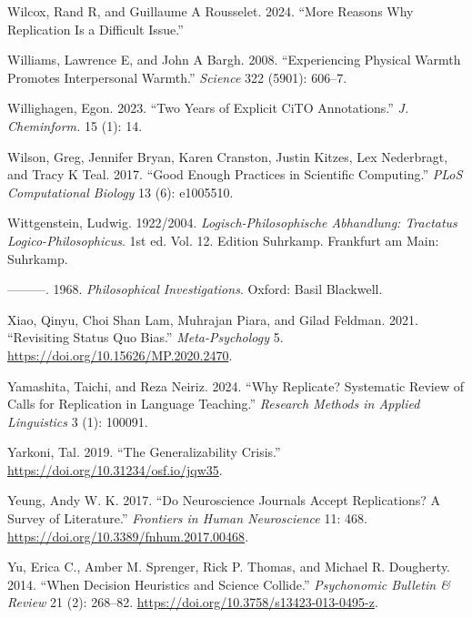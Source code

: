 \documentclass[
  letterpaper,
  DIV=11,
  numbers=noendperiod]{scrreprt}
\newlength{\cslhangindent}
\newenvironment{CSLReferences}[2] %
 {\begin{list}{}{%
  \setlength{\itemindent}{0pt}
  \setlength{\leftmargin}{0pt}
  \setlength{\parsep}{0pt}
  \ifodd #1
   \setlength{\leftmargin}{\cslhangindent}
   \setlength{\itemindent}{-1\cslhangindent}
  \fi
  \setlength{\itemsep}{#2\baselineskip}}}
 {\end{list}}
\begin{document}
\begin{CSLReferences}{1}{0}
Wilcox, Rand R, and Guillaume A Rousselet. 2024. {``More Reasons Why
Replication Is a Difficult Issue.''}

Williams, Lawrence E, and John A Bargh. 2008. {``Experiencing Physical
Warmth Promotes Interpersonal Warmth.''} \emph{Science} 322 (5901):
606--7.

Willighagen, Egon. 2023. {``Two Years of Explicit {CiTO} Annotations.''}
\emph{J. Cheminform.} 15 (1): 14.

Wilson, Greg, Jennifer Bryan, Karen Cranston, Justin Kitzes, Lex
Nederbragt, and Tracy K Teal. 2017. {``Good Enough Practices in
Scientific Computing.''} \emph{PLoS Computational Biology} 13 (6):
e1005510.

Wittgenstein, Ludwig. 1922/2004. \emph{Logisch-Philosophische
Abhandlung: Tractatus Logico-Philosophicus}. 1st ed. Vol. 12. Edition
Suhrkamp. Frankfurt am Main: Suhrkamp.

---------. 1968. \emph{Philosophical Investigations}. Oxford: {Basil
Blackwell}.

Xiao, Qinyu, Choi Shan Lam, Muhrajan Piara, and Gilad Feldman. 2021.
{``Revisiting Status Quo Bias.''} \emph{Meta-Psychology} 5.
\url{https://doi.org/10.15626/MP.2020.2470}.

Yamashita, Taichi, and Reza Neiriz. 2024. {``Why Replicate? Systematic
Review of Calls for Replication in Language Teaching.''} \emph{Research
Methods in Applied Linguistics} 3 (1): 100091.

Yarkoni, Tal. 2019. {``The Generalizability Crisis.''}
\url{https://doi.org/10.31234/osf.io/jqw35}.

Yeung, Andy W. K. 2017. {``Do Neuroscience Journals Accept Replications?
A Survey of Literature.''} \emph{Frontiers in Human Neuroscience} 11:
468. \url{https://doi.org/10.3389/fnhum.2017.00468}.

Yu, Erica C., Amber M. Sprenger, Rick P. Thomas, and Michael R.
Dougherty. 2014. {``When Decision Heuristics and Science Collide.''}
\emph{Psychonomic Bulletin {\&} Review} 21 (2): 268--82.
\url{https://doi.org/10.3758/s13423-013-0495-z}.


\end{CSLReferences}
\end{document}
